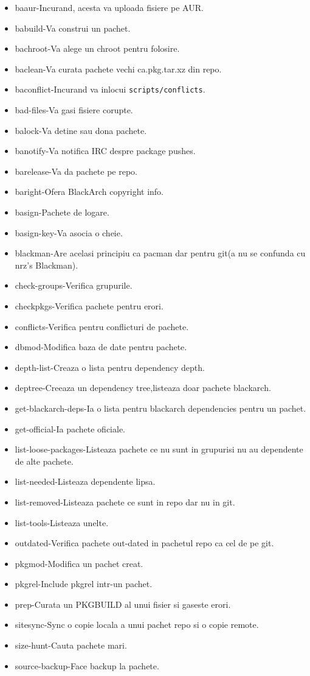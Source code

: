 \documentclass[a4paper, oneside, 11pt]{book}
\begin{document}
\begin{itemize}
\item baaur-Incurand, acesta va uploada fisiere pe  AUR.
\item babuild-Va construi un pachet.
\item bachroot-Va alege un chroot pentru folosire.
\item baclean-Va curata pachete vechi ca.pkg.tar.xz din  repo.
\item baconflict-Incurand va inlocui \verb|scripts/conflicts|.
\item bad-files-Va gasi fisiere corupte.
\item balock-Va detine sau dona pachete.
\item banotify-Va notifica IRC despre package pushes.
\item barelease-Va da pachete pe repo.
\item baright-Ofera  BlackArch copyright info.
\item basign-Pachete de logare.
\item basign-key-Va asocia o cheie.
\item blackman-Are acelasi principiu ca pacman dar pentru git(a nu se confunda cu nrz's Blackman).
\item check-groups-Verifica grupurile.
\item checkpkgs-Verifica pachete pentru erori.
\item conflicts-Verifica pentru conflicturi de pachete.
\item dbmod-Modifica baza de date pentru pachete.
\item depth-list-Creaza o lista pentru dependency depth.
\item deptree-Creeaza un dependency tree,listeaza doar pachete blackarch.
\item get-blackarch-deps-Ia o lista pentru blackarch dependencies pentru un pachet.
\item get-official-Ia pachete oficiale.
\item list-loose-packages-Listeaza pachete ce nu sunt in grupurisi nu au dependente de alte pachete.
\item list-needed-Listeaza dependente lipsa.
\item list-removed-Listeaza pachete ce sunt in  repo dar nu in git.
\item list-tools-Listeaza  unelte.
\item outdated-Verifica pachete out-dated in pachetul repo ca cel de pe git.
\item pkgmod-Modifica un pachet creat.
\item pkgrel-Include pkgrel intr-un pachet.
\item prep-Curata un PKGBUILD al unui fisier si gaseste erori.
\item sitesync-Sync o copie locala a unui pachet repo si o copie remote.
\item size-hunt-Cauta pachete mari.
\item source-backup-Face backup la pachete.
\end{itemize}
\end{document}
